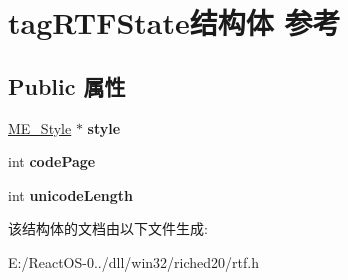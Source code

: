 \hypertarget{structtag_r_t_f_state}{}\section{tag\+R\+T\+F\+State结构体 参考}
\label{structtag_r_t_f_state}
\subsection*{Public 属性}
\begin{DoxyCompactItemize}
\item 
\mbox{\label{structtag_r_t_f_state_a96fa321b3fa78b8bc4d2b93796e7ade0}} 
\hyperlink{structtag_m_e___style}{M\+E\+\_\+\+Style} $\ast$ {\bfseries style}
\item 
\mbox{\label{structtag_r_t_f_state_a1b788db2e65c06db3788df266d6d2f6a}} 
int {\bfseries code\+Page}
\item 
\mbox{\label{structtag_r_t_f_state_a8ca773292aacfbd6c55c3a7dfb5a7aee}} 
int {\bfseries unicode\+Length}
\end{DoxyCompactItemize}


该结构体的文档由以下文件生成\+:\begin{DoxyCompactItemize}
\item 
E\+:/\+React\+O\+S-\/0../dll/win32/riched20/rtf.\+h\end{DoxyCompactItemize}
